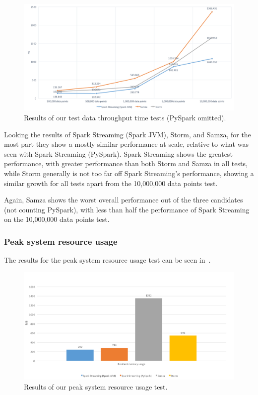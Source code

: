 \begin{figure}[H]
  \centering
  \includegraphics[width=1\textwidth]{includes/figures/fig_throughput_nopyspark_res}
  \caption{Results of our test data throughput time tests (PySpark omitted).}
  \label{fig:throughput_time_res_nopyspark}
\end{figure}

Looking the results of Spark Streaming (Spark JVM), Storm, and Samza, for the most part they show a mostly similar performance
at scale, relative to what was seen with Spark Streaming (PySpark). Spark Streaming shows the greatest performance, with
greater performance than both Storm and Samza in all tests, while Storm generally is not too far off Spark Streaming's
performance, showing a similar growth for all tests apart from the 10,\@000,\@000 data points test.

Again, Samza shows the worst overall performance out of the three candidates (not counting PySpark), with less than
half the performance of Spark Streaming on the 10,\@000,\@000 data points test.

\subsubsection{Peak system resource usage}

The results for the peak system resource usage test can be seen in~.

\begin{figure}[H]
  \centering
  \includegraphics[width=1\textwidth]{includes/figures/fig_peak_resource_res}
  \caption{Results of our peak system resource usage test.}
  \label{fig:resource_usage_res}
\end{figure}

